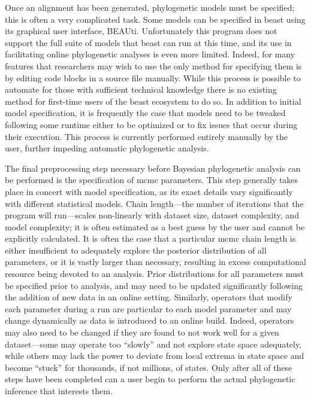 Once an alignment has been generated, phylogenetic models must be specified; this is often a very complicated task.
Some models can be specified in \gls{beast} using its graphical user interface, BEAUti.
Unfortunately this program does not support the full suite of models that \gls{beast} can run at this time, and its use in facilitating online phylogenetic analyses is even more limited.
Indeed, for many features that researchers may wish to use the only method for specifying them is by editing code blocks in a source file manually.
While this process is possible to automate for those with sufficient technical knowledge there is no existing method for first-time users of the \gls{beast} ecosystem to do so.
In addition to initial model specification, it is frequently the case that models need to be tweaked following some runtime either to be optimized or to fix issues that occur during their execution.
This process is currently performed entirely manually by the user, further impeding automatic phylogenetic analysis.

The final preprocessing step necessary before Bayesian phylogenetic analysis can be performed is the specification of \gls{mcmc} parameters.
This step generally takes place in concert with model specification, as its exact details vary significantly with different statistical models.
Chain length---the number of iterations that the program will run---scales non-linearly with dataset size, dataset complexity, and model complexity; it is often estimated as a best guess by the user and cannot be explicitly calculated.
It is often the case that a particular \gls{mcmc} chain length is either insufficient to adequately explore the posterior distribution of all parameters, or it is vastly larger than necessary, resulting in excess computational resource being devoted to an analysis.
Prior distributions for all parameters must be specified prior to analysis, and may need to be updated significantly following the addition of new data in an online setting.
Similarly, operators that modify each parameter during a run are particular to each model parameter and may change dynamically as data is introduced to an online build.
Indeed, operators may also need to be changed if they are found to not work well for a given dataset---some may operate too ``slowly'' and not explore state space adequately, while others may lack the power to deviate from local extrema in state space and become ``stuck'' for thousands, if not millions, of states.
Only after all of these steps have been completed can a user begin to perform the actual phylogenetic inference that interests them.

